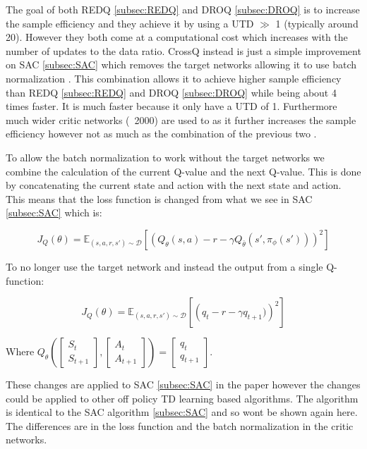 The goal of both REDQ \ref{subsec:REDQ} and DROQ \ref{subsec:DROQ} is to increase the sample efficiency and they achieve it by using a UTD $\gg$ 1 (typically around 20). However they both come at a computational cost which increases with the number of updates to the data ratio. CrossQ \cite{bhattCrossQBatchNormalization2024} instead is just a simple improvement on SAC \ref{subsec:SAC} which removes the target networks allowing it to use batch normalization \cite{ioffeBatchRenormalizationReducing2017}. This combination allows it to achieve higher sample efficiency than REDQ \ref{subsec:REDQ} and DROQ \ref{subsec:DROQ} while being about 4 times faster. It is much faster because it only have a UTD of 1. Furthermore much wider critic networks (~2000) are used to as it further increases the sample efficiency however not as much as the combination of the previous two \cite{bhattCrossQBatchNormalization2024}.

To allow the batch normalization to work without the target networks we combine the calculation of the current Q-value and the next Q-value. This is done by concatenating the current state and action with the next state and action. This means that the loss function is changed from what we see in SAC \ref{subsec:SAC} which is:

\begin{equation}
    J_Q(\theta) = \mathbb{E}_{(s,a,r,s') \sim \mathcal{D}} \left[ \left( Q_{\theta}(s,a) - r - \gamma Q_{\bar{\theta}}(s',\pi_{\phi}(s')) \right)^2 \right]
\end{equation}

To no longer use the target network and instead the output from a single Q-function:

\begin{equation}
    J_Q(\theta) = \mathbb{E}_{(s,a,r,s') \sim \mathcal{D}} \left[ \left( q_t - r - \gamma q_{t+1}) \right)^2 \right]
\end{equation}

Where $Q_\theta( \left[ \begin{matrix} S_t \\ S_{t+1} \end{matrix}\right], \left[ \begin{matrix} A_t \\ A_{t+1} \end{matrix}\right]) = \left[ \begin{matrix} q_t \\ q_{t+1} \end{matrix}\right]$. 

\smallskip


These changes are applied to SAC \ref{subsec:SAC} in the paper however the changes could be applied to other off policy TD learning based algorithms. The algorithm is identical to the SAC algorithm \ref{subsec:SAC} and so wont be shown again here. The differences are in the loss function and the batch normalization in the critic networks.